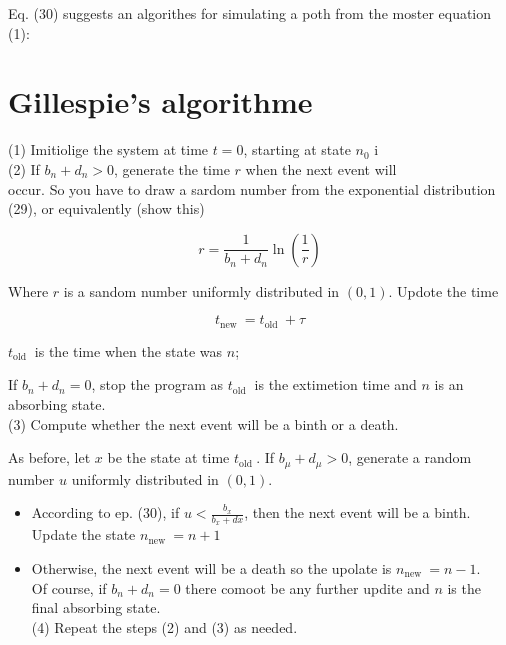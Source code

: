 \documentclass[10pt]{article}
\begin{document}
Eq. (30) suggests an algorithes for simulating a poth from the moster equation (1):

\section*{Gillespie's algorithme}
(1) Imitiolige the system at time $t=0$, starting at state $n_{0}$ i\\
(2) If $b_{n}+d_{n}>0$, generate the time $r$ when the next event will\\
occur. So you have to draw a sardom number from the exponential distribution (29), or equivalently (show this)

$$
r=\frac{1}{b_{n}+d_{n}} \ln \left(\frac{1}{r}\right)
$$

Where $r$ is a sandom number uniformly distributed in $(0,1)$. Updote the time

$$
t_{\text {new }}=t_{\text {old }}+\tau
$$

$t_{\text {old }}$ is the time when the state was $n$;

If $b_{n}+d_{n}=0$, stop the program as $t_{\text {old }}$ is the extimetion time and $n$ is an absorbing state.\\
(3) Compute whether the next event will be a binth or a death.

As before, let $x$ be the state at time $t_{\text {old }}$. If $b_{\mu}+d_{\mu}>0$, generate a random number $u$ uniformly distributed in $(0,1)$.

\begin{itemize}
  \item According to ep. (30), if $u<\frac{b_{x}}{b_{x}+d x}$, then the next event will be a binth. Update the state $n_{\text {new }}=n+1$
  \item Otherwise, the next event will be a death so the upolate is $n_{\text {new }}=n-1$.\\
Of course, if $b_{n}+d_{n}=0$ there comoot be any further updite and $n$ is the final absorbing state.\\
(4) Repeat the steps (2) and (3) as needed.
\end{itemize}
\end{document}
